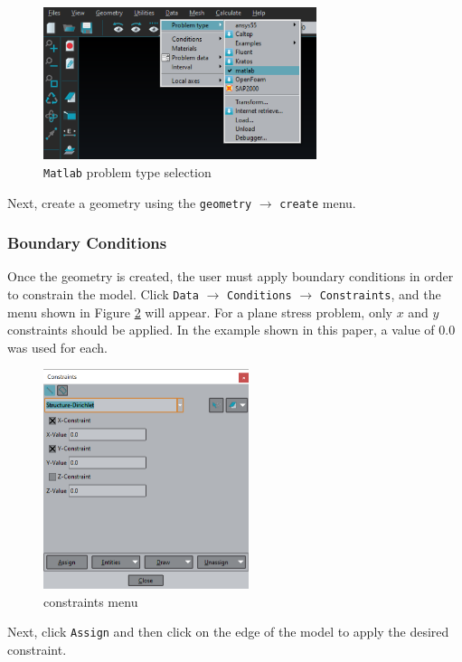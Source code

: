 \begin{figure}[ht]
  \centering
  \includegraphics[width=80mm]{images/GiD_probtype.png}
  \caption{\texttt{Matlab} problem type selection}
  \label{fig:Matlabproblemtype}
\end{figure}
Next, create a geometry using the \texttt{geometry} $\rightarrow$ \texttt{create} menu.

\subsubsection{Boundary Conditions}
Once the geometry is created, the user must apply boundary conditions in order to constrain the model. Click \texttt{Data} $\rightarrow$ \texttt{Conditions} $\rightarrow$ \texttt{Constraints}, and the menu shown in Figure \ref{fig:GiDConstraints} will appear. For a plane stress problem, only $x$ and $y$ constraints should be applied. In the example shown in this paper, a value of 0.0 was used for each.\\[6pt]
\begin{figure}[ht]
  \centering
  \includegraphics[width=60mm]{images/GiD_constraints.png}
  \caption{constraints menu}
  \label{fig:GiDConstraints}
\end{figure}
Next, click \texttt{Assign} and then click on the edge of the model to apply the desired constraint.

